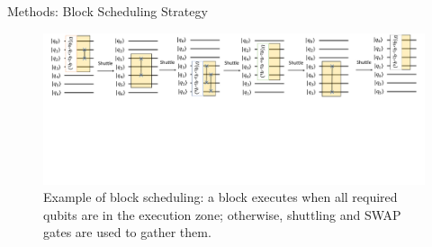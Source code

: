 \documentclass{beamer}
\begin{document}
	\begin{frame}{Methods: Block Scheduling Strategy}
		\begin{figure}
			\includegraphics[width=.9\textwidth]{figure/block-schedule-long.pdf}
			\caption[]{Example of block scheduling: a block executes when all required qubits are in the execution zone; otherwise, shuttling and SWAP gates are used to gather them.}
		\end{figure}
	\end{frame}
	
\end{document}
